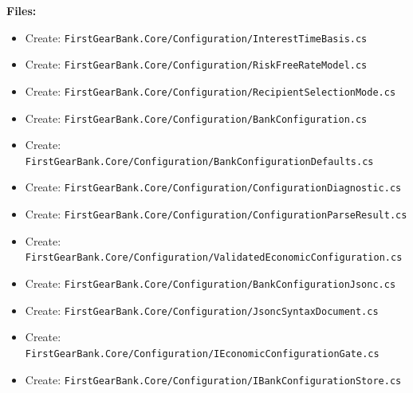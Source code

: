 \documentclass[
  10pt,
  letterpaper,
]{article}
\providecommand{\tightlist}{%
  \setlength{\itemsep}{0pt}\setlength{\parskip}{0pt}}
\begin{document}
\textbf{Files:}

\begin{itemize}
\tightlist
\item
  Create:
  \texttt{FirstGearBank.}\allowbreak{}\texttt{Core/}\allowbreak{}\texttt{Configuration/}\allowbreak{}\texttt{InterestTimeBasis.}\allowbreak{}\texttt{cs}
\item
  Create:
  \texttt{FirstGearBank.}\allowbreak{}\texttt{Core/}\allowbreak{}\texttt{Configuration/}\allowbreak{}\texttt{RiskFreeRateModel.}\allowbreak{}\texttt{cs}
\item
  Create:
  \texttt{FirstGearBank.}\allowbreak{}\texttt{Core/}\allowbreak{}\texttt{Configuration/}\allowbreak{}\texttt{RecipientSelectionMode.}\allowbreak{}\texttt{cs}
\item
  Create:
  \texttt{FirstGearBank.}\allowbreak{}\texttt{Core/}\allowbreak{}\texttt{Configuration/}\allowbreak{}\texttt{BankConfiguration.}\allowbreak{}\texttt{cs}
\item
  Create:
  \texttt{FirstGearBank.}\allowbreak{}\texttt{Core/}\allowbreak{}\texttt{Configuration/}\allowbreak{}\texttt{BankConfigurationDefaults.}\allowbreak{}\texttt{cs}
\item
  Create:
  \texttt{FirstGearBank.}\allowbreak{}\texttt{Core/}\allowbreak{}\texttt{Configuration/}\allowbreak{}\texttt{ConfigurationDiagnostic.}\allowbreak{}\texttt{cs}
\item
  Create:
  \texttt{FirstGearBank.}\allowbreak{}\texttt{Core/}\allowbreak{}\texttt{Configuration/}\allowbreak{}\texttt{ConfigurationParseResult.}\allowbreak{}\texttt{cs}
\item
  Create:
  \texttt{FirstGearBank.}\allowbreak{}\texttt{Core/}\allowbreak{}\texttt{Configuration/}\allowbreak{}\texttt{ValidatedEconomicConfiguration.}\allowbreak{}\texttt{cs}
\item
  Create:
  \texttt{FirstGearBank.}\allowbreak{}\texttt{Core/}\allowbreak{}\texttt{Configuration/}\allowbreak{}\texttt{BankConfigurationJsonc.}\allowbreak{}\texttt{cs}
\item
  Create:
  \texttt{FirstGearBank.}\allowbreak{}\texttt{Core/}\allowbreak{}\texttt{Configuration/}\allowbreak{}\texttt{JsoncSyntaxDocument.}\allowbreak{}\texttt{cs}
\item
  Create:
  \texttt{FirstGearBank.}\allowbreak{}\texttt{Core/}\allowbreak{}\texttt{Configuration/}\allowbreak{}\texttt{IEconomicConfigurationGate.}\allowbreak{}\texttt{cs}
\item
  Create:
  \texttt{FirstGearBank.}\allowbreak{}\texttt{Core/}\allowbreak{}\texttt{Configuration/}\allowbreak{}\texttt{IBankConfigurationStore.}\allowbreak{}\texttt{cs}

\end{itemize}
\end{document}
